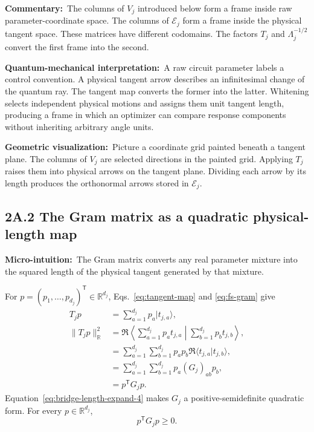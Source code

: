 \documentclass[10pt,twocolumn]{article}
\newcommand{\ket}[1]{|#1\rangle}
\newcommand{\micro}[1]{\par\noindent\textbf{Micro-intuition:}\ #1\par}
\newcommand{\commentary}[1]{\par\noindent\textbf{Commentary:}\ #1\par}
\newcommand{\phys}[1]{\par\noindent\textbf{Quantum-mechanical interpretation:}\ #1\par}
\newcommand{\geom}[1]{\par\noindent\textbf{Geometric visualization:}\ \textcolor{teal!70!black}{#1}\par}
\newcommand{\conceptbreak}{\par\medskip\noindent{\color{black!30}\rule{\columnwidth}{0.35pt}}\par\medskip}
\begin{document}
\commentary{The columns of \(V_j\) introduced below form a frame inside raw
parameter-coordinate space. The columns of \(\mathcal E_j\) form a frame
inside the physical tangent space. These matrices have different codomains.
The factors \(T_j\) and \(\Lambda_j^{-1/2}\) convert the first frame into the
second.}

\phys{A raw circuit parameter labels a control convention. A physical tangent
arrow describes an infinitesimal change of the quantum ray. The tangent map
converts the former into the latter. Whitening selects independent physical
motions and assigns them unit tangent length, producing a frame in which an
optimizer can compare response components without inheriting arbitrary angle
units.}

\geom{Picture a coordinate grid painted beneath a tangent plane. The columns
of \(V_j\) are selected directions in the painted grid. Applying \(T_j\)
raises them into physical arrows on the tangent plane. Dividing each arrow by
its length produces the orthonormal arrows stored in \(\mathcal E_j\).}

\conceptbreak

\subsection*{2A.2 The Gram matrix as a quadratic physical-length map}

\micro{The Gram matrix converts any real parameter mixture into the squared
length of the physical tangent generated by that mixture.}

For \(p=(p_1,\ldots,p_{d_j})^{\mathsf T}\in\mathbb R^{d_j}\),
Eqs.~\eqref{eq:tangent-map} and \eqref{eq:fs-gram} give
\begin{align}
T_jp
&=\sum_{a=1}^{d_j}p_a\ket{t_{j,a}},
\label{eq:bridge-tangent-mixture}\\
\|T_jp\|_{\mathbb R}^2
&=\Re\left\langle
\sum_{a=1}^{d_j}p_at_{j,a}
\middle|
\sum_{b=1}^{d_j}p_bt_{j,b}
\right\rangle,
\label{eq:bridge-length-expand-1}\\
&=\sum_{a=1}^{d_j}\sum_{b=1}^{d_j}
p_ap_b\Re\langle t_{j,a}|t_{j,b}\rangle,
\label{eq:bridge-length-expand-2}\\
&=\sum_{a=1}^{d_j}\sum_{b=1}^{d_j}
p_a(G_j)_{ab}p_b,
\label{eq:bridge-length-expand-3}\\
&=p^{\mathsf T}G_jp.
\label{eq:bridge-length-expand-4}
\end{align}
Equation~\eqref{eq:bridge-length-expand-4} makes \(G_j\) a positive-semidefinite
quadratic form. For every \(p\in\mathbb R^{d_j}\),
\begin{equation}
p^{\mathsf T}G_jp\geq0.
\label{eq:bridge-gram-psd}
\end{equation}
\end{document}
